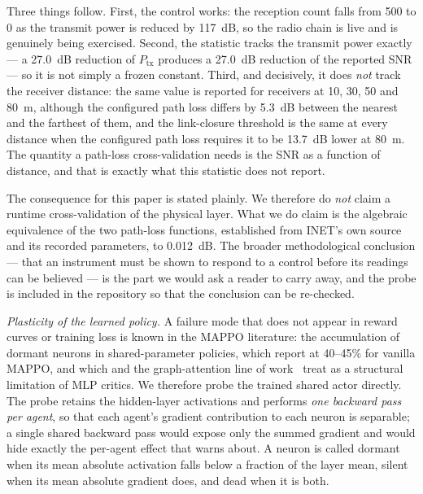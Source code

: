 \documentclass[conference]{IEEEtran}
\newcommand{\tokPhyDelta}{0.012}
\begin{document}
Three things follow. First, the control works: the reception count falls
from 500 to 0 as the transmit power is reduced by 117~dB, so the radio chain
is live and is genuinely being exercised. Second, the statistic tracks the
transmit power exactly --- a 27.0~dB reduction of $P_{\mathrm{tx}}$ produces
a 27.0~dB reduction of the reported SNR --- so it is not simply a frozen
constant. Third, and decisively, it does \emph{not} track the receiver
distance: the same value is reported for receivers at 10, 30, 50 and 80~m,
although the configured path loss differs by 5.3~dB between the nearest and
the farthest of them, and the link-closure threshold is the same at every
distance when the configured path loss requires it to be 13.7~dB lower at
80~m. The quantity a path-loss cross-validation needs is the SNR as a
function of distance, and that is exactly what this statistic does not
report.

The consequence for this paper is stated plainly. We therefore do
\emph{not} claim a runtime cross-validation of the physical layer. What we
do claim is the algebraic equivalence of the two path-loss functions,
established from INET's own source and its recorded parameters, to
\tokPhyDelta{}~dB. The broader methodological conclusion --- that an instrument must
be shown to respond to a control before its readings can be believed --- is
the part we would ask a reader to carry away, and the probe is included in
the repository so that the conclusion can be re-checked.

\emph{Plasticity of the learned policy.} A failure mode that does not appear
in reward curves or training loss is known in the MAPPO literature: the
accumulation of dormant neurons in shared-parameter policies, which
\cite{prime2026} report at 40--45\% for vanilla MAPPO, and which
\cite{ceilings2026} and the graph-attention line of work~\cite{shi2025} treat
as a structural limitation of MLP critics. We therefore probe the trained
shared actor directly. The probe retains the hidden-layer activations and
performs \emph{one backward pass per agent}, so that each agent's gradient
contribution to each neuron is separable; a single shared backward pass would
expose only the summed gradient and would hide exactly the per-agent effect
that \cite{prime2026} warns about. A neuron is called dormant when its mean
absolute activation falls below a fraction of the layer mean, silent when its
mean absolute gradient does, and dead when it is both.
\end{document}

